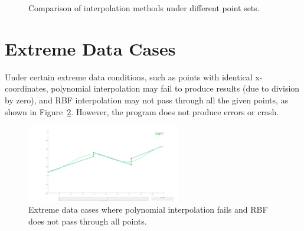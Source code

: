 \documentclass[12pt,a4paper]{report}
\begin{document}
\begin{figure}[htbp]
            \hfill

            \caption{Comparison of interpolation methods under different point sets.}
            \label{fig:interpolation_comparison}
        \end{figure}

        \section{Extreme Data Cases}
            Under certain extreme data conditions, such as points with identical x-coordinates, polynomial interpolation may fail to produce results (due to division by zero), and RBF interpolation may not pass through all the given points, as shown in Figure~\ref{fig:extreme}. However, the program does not produce errors or crash.

        \begin{figure}[htbp]
            \centering
            \includegraphics[width=0.6\textwidth]{Figure/30extreme.png}
            \caption{Extreme data cases where polynomial interpolation fails and RBF does not pass through all points.}
            \label{fig:extreme}
        \end{figure}
\end{document}
